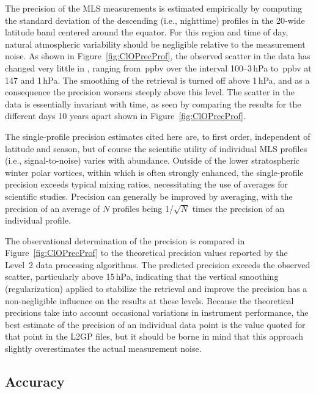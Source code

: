 The precision of the MLS  measurements is estimated empirically by computing the standard deviation of the descending (i.e., nighttime) profiles in the 20{\degsym}-wide latitude band centered around the equator. For this region and time of day, natural atmospheric variability should be negligible relative to the measurement noise. As shown in Figure~\ref{fig:ClOPrecProf}, the observed scatter in the data has changed very little in \thisv, ranging from \,ppbv over the interval 100--3\,hPa to \,ppbv at 147 and 1\,hPa. The smoothing of the retrieval is turned off above 1\,hPa, and as a consequence the precision worsens steeply above this level. The scatter in the data is essentially invariant with time, as seen by comparing the results for the different days 10 years apart shown in Figure~\ref{fig:ClOPrecProf}.

The single-profile precision estimates cited here are, to first order, independent of latitude and season, but of course the scientific utility of individual MLS profiles (i.e., signal-to-noise) varies with  abundance. Outside of the lower stratospheric winter polar vortices, within which  is often strongly enhanced, the single-profile precision exceeds typical  mixing ratios, necessitating the use of averages for scientific studies. Precision can generally be improved by averaging, with the precision of an average of $N$ profiles being 1/$\sqrt{N}$ times the precision of an individual profile.

The observational determination of the precision is compared in Figure~\ref{fig:ClOPrecProf} to the theoretical precision values reported by the Level~2 data processing algorithms. The predicted precision exceeds the observed scatter, particularly above 15\,hPa, indicating that the vertical smoothing (regularization) applied to stabilize the retrieval and improve the precision has a non-negligible influence on the results at these levels. Because the theoretical precisions take into account occasional variations in instrument performance, the best estimate of the precision of an individual data point is the value quoted for that point in the L2GP files, but it should be borne in mind that this approach slightly overestimates the actual measurement noise.

\subsection{Accuracy}
\label{sec:cloacc}

